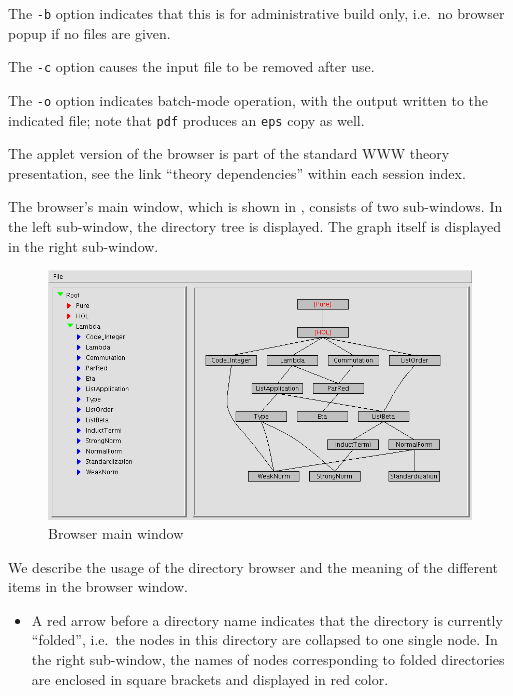 \begin{isabellebody}
\begin{isamarkuptext}
  \medskip The \verb|-b| option indicates that this is for
  administrative build only, i.e.\ no browser popup if no files are
  given.

  The \verb|-c| option causes the input file to be removed
  after use.

  The \verb|-o| option indicates batch-mode operation, with the
  output written to the indicated file; note that \verb|pdf|
  produces an \verb|eps| copy as well.

  \medskip The applet version of the browser is part of the standard
  WWW theory presentation, see the link ``theory dependencies'' within
  each session index.%
\end{isamarkuptext}%
\isamarkuptrue%
%
\isamarkuptrue%
%
\begin{isamarkuptext}%
The browser's main window, which is shown in
  , consists of two sub-windows.  In the
  left sub-window, the directory tree is displayed. The graph itself
  is displayed in the right sub-window.

  \begin{figure}[ht]
  \includegraphics[width=\textwidth]{browser_screenshot}
  \caption{\label{fig:browserwindow} Browser main window}
  \end{figure}%
\end{isamarkuptext}%
\isamarkuptrue%
%
\isamarkuptrue%
%
\begin{isamarkuptext}%
We describe the usage of the directory browser and the meaning of
  the different items in the browser window.

  \begin{itemize}
  
  \item A red arrow before a directory name indicates that the
  directory is currently ``folded'', i.e.~the nodes in this directory
  are collapsed to one single node. In the right sub-window, the names
  of nodes corresponding to folded directories are enclosed in square
  brackets and displayed in red color.
  

\end{itemize}
\end{isamarkuptext}
\end{isabellebody}
